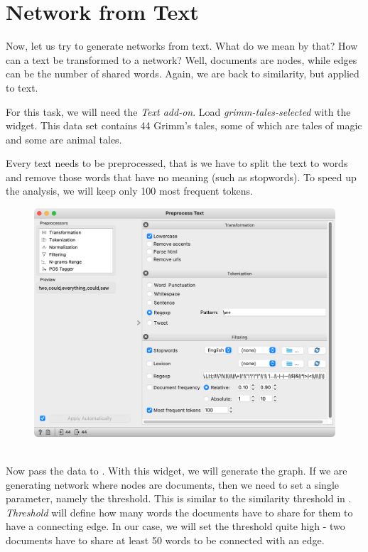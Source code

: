 \chapter{Network from Text}

Now, let us try to generate networks from text. What do we mean by that? How can a text be transformed to a network? Well, documents are nodes, while edges can be the number of shared words. Again, we are back to similarity, but applied to text.

For this task, we will need the \emph{Text add-on}. Load \emph{grimm-tales-selected} with the  widget. This data set contains 44 Grimm's tales, some of which are tales of magic and some are animal tales.

Every text needs to be preprocessed, that is we have to split the text to words and remove those words that have no meaning (such as stopwords). To speed up the analysis, we will keep only 100 most frequent tokens.

\begin{figure}[h]
    \centering
    \includegraphics[width=\linewidth]{preprocess-text.png}
    \caption{$\;$}
\end{figure}

Now pass the data to . With this widget, we will generate the graph. If we are generating network where nodes are documents, then we need to set a single parameter, namely the threshold. This is similar to the similarity threshold in . \emph{Threshold} will define how many words the documents have to share for them to have a connecting edge. In our case, we will set the threshold quite high - two documents have to share at least 50 words to be connected with an edge.

